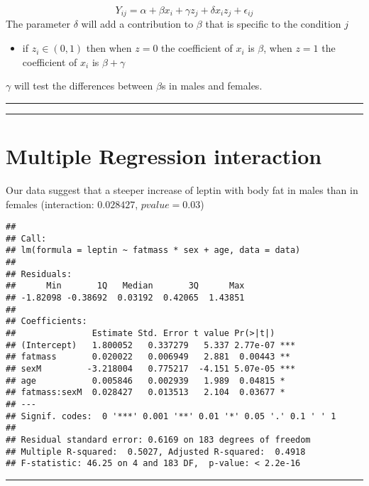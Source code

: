 \documentclass[
]{book}
\providecommand{\tightlist}{%
  \setlength{\itemsep}{0pt}\setlength{\parskip}{0pt}}
\begin{document}
\[Y_{ij} = \alpha + \beta x_{i} +\gamma z_j + \delta x_{i}z_j +\epsilon_{ij}\]
The parameter \(\delta\) will add a contribution to \(\beta\) that is specific to the condition \(j\)

\begin{itemize}
\tightlist
\item
  if \(z_i \in (0,1)\) then when \(z=0\) the coefficient of \(x_i\) is \(\beta\), when \(z=1\) the coefficient of \(x_i\) is \(\beta+\gamma\)
\end{itemize}

\(\gamma\) will test the differences between \(\beta\)s in males and females.

\begin{center}\rule{0.5\linewidth}{0.5pt}\end{center}

\begin{center}\rule{0.5\linewidth}{0.5pt}\end{center}

\hypertarget{multiple-regression-interaction-1}{%
\section{Multiple Regression interaction}\label{multiple-regression-interaction-1}}

Our data suggest that a steeper increase of leptin with body fat in males than in females (interaction: \(0.028427\), \(pvalue=0.03\))

\begin{verbatim}
## 
## Call:
## lm(formula = leptin ~ fatmass * sex + age, data = data)
## 
## Residuals:
##      Min       1Q   Median       3Q      Max 
## -1.82098 -0.38692  0.03192  0.42065  1.43851 
## 
## Coefficients:
##               Estimate Std. Error t value Pr(>|t|)    
## (Intercept)   1.800052   0.337279   5.337 2.77e-07 ***
## fatmass       0.020022   0.006949   2.881  0.00443 ** 
## sexM         -3.218004   0.775217  -4.151 5.07e-05 ***
## age           0.005846   0.002939   1.989  0.04815 *  
## fatmass:sexM  0.028427   0.013513   2.104  0.03677 *  
## ---
## Signif. codes:  0 '***' 0.001 '**' 0.01 '*' 0.05 '.' 0.1 ' ' 1
## 
## Residual standard error: 0.6169 on 183 degrees of freedom
## Multiple R-squared:  0.5027, Adjusted R-squared:  0.4918 
## F-statistic: 46.25 on 4 and 183 DF,  p-value: < 2.2e-16
\end{verbatim}

\begin{center}\rule{0.5\linewidth}{0.5pt}\end{center}
\end{document}
